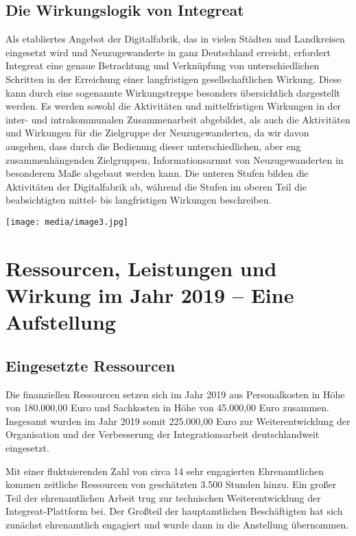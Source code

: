 \documentclass[12pt, a4paper]{article} %
\begin{document}
\hypertarget{die-wirkungslogik-von-integreat}{%
\subsection{Die Wirkungslogik von
Integreat}\label{die-wirkungslogik-von-integreat}}

Als etabliertes Angebot der Digitalfabrik, das in vielen Städten und
Landkreisen eingesetzt wird und Neuzugewanderte in ganz Deutschland
erreicht, erfordert Integreat eine genaue Betrachtung und Verknüpfung
von unterschiedlichen Schritten in der Erreichung einer langfristigen
gesellschaftlichen Wirkung. Diese kann durch eine sogenannte
Wirkungstreppe besonders übersichtlich dargestellt werden. Es werden
sowohl die Aktivitäten und mittelfristigen Wirkungen in der inter- und
intrakommunalen Zusammenarbeit abgebildet, als auch die Aktivitäten und
Wirkungen für die Zielgruppe der Neuzugewanderten, da wir davon
ausgehen, dass durch die Bedienung dieser unterschiedlichen, aber eng
zusammenhängenden Zielgruppen, Informationsarmut von Neuzugewanderten in
besonderem Maße abgebaut werden kann. Die unteren Stufen bilden die
Aktivitäten der Digitalfabrik ab, während die Stufen im oberen Teil die
beabsichtigten mittel- bis langfristigen Wirkungen beschreiben.

\texttt{[image: media/image3.jpg]}

\hypertarget{ressourcen-leistungen-und-wirkung-im-jahr-2019-eine-aufstellung}{%
\section{Ressourcen, Leistungen und Wirkung im Jahr 2019 – Eine
Aufstellung}\label{ressourcen-leistungen-und-wirkung-im-jahr-2019-eine-aufstellung}}

\hypertarget{eingesetzte-ressourcen}{%
\subsection{Eingesetzte Ressourcen}\label{eingesetzte-ressourcen}}

Die finanziellen Ressourcen setzen sich im Jahr 2019 aus Personalkosten
in Höhe von 180.000,00 Euro und Sachkosten in Höhe von 45.000,00 Euro
zusammen. Insgesamt wurden im Jahr 2019 somit 225.000,00 Euro zur
Weiterentwicklung der Organisation und der Verbesserung der
Integrationsarbeit deutschlandweit eingesetzt.

Mit einer fluktuierenden Zahl von circa 14 sehr engagierten
Ehrenamtlichen kommen zeitliche Ressourcen von geschätzten 3.500 Stunden
hinzu. Ein großer Teil der ehrenamtlichen Arbeit trug zur technischen
Weiterentwicklung der Integreat-Plattform bei. Der Großteil der
hauptamtlichen Beschäftigten hat sich zunächst ehrenamtlich engagiert
und wurde dann in die Anstellung übernommen.
\end{document}
